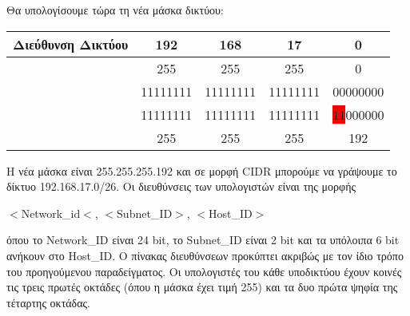 Θα υπολογίσουμε τώρα τη νέα μάσκα δικτύου:

\begin{center}
\fontsize{11}{13}
\ttfamily
\begin{tabular}{|c|c|c|c|c|}
\hline
 \textbf{Διεύθυνση Δικτύου} & 192 & 168 & 17 & 0 \\ 
\hline
\multirow{2}{*}{} \textbf{Παλιά Μάσκα} & 255 & 255 & 255  & 0 \\ 
\cline{2-5} 
              \textbf{Δικτύου} & 11111111  & 11111111 & 11111111 & 00000000 \\ 
\hline
\multirow{2}{*}{} \textbf{Νέα Μάσκα} & 11111111 & 11111111 & 11111111 & \colorbox{red}{11}000000  \\ 
\cline{2-5} 
             \textbf{Υποδικτύου} & 255 & 255 & 255 & 192 \\ 
\hline
\end{tabular}
\normalfont
\end{center}

Η νέα μάσκα είναι 255.255.255.192 και σε μορφή CIDR μπορούμε να γράψουμε το δίκτυο 192.168.17.0/26. Οι διευθύνσεις των υπολογιστών είναι της μορφής 

$<$Network\_id$<$, $<$Subnet\_ID$>$, $<$Host\_ID$>$

όπου το Network\_ID είναι 24 bit, το Subnet\_ID είναι 2 bit και τα υπόλοιπα 6 bit ανήκουν στο Host\_ID. Ο πίνακας διευθύνσεων προκύπτει ακριβώς με τον ίδιο τρόπο του προηγούμενου παραδείγματος. Οι υπολογιστές του κάθε υποδικτύου έχουν κοινές τις τρεις πρωτές οκτάδες (όπου η μάσκα έχει τιμή 255) και τα δυο πρώτα ψηφία της τέταρτης οκτάδας.

